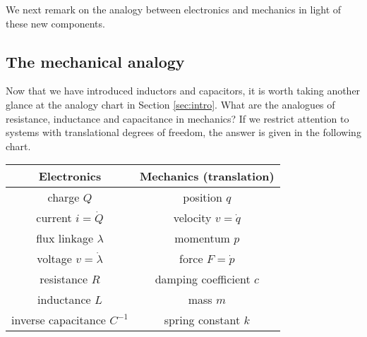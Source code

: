 We next remark on the analogy between electronics and mechanics in light of
these new components.

\subsection{The mechanical analogy} \label{sec:mechanical}

Now that we have introduced inductors and capacitors, it is worth taking 
another glance at the analogy chart in Section \ref{sec:intro}.  What are the
analogues of resistance, inductance and capacitance in mechanics?  If we restrict attention to systems with translational degrees of freedom, the answer is given in the following
chart.

\begin{small}
\begin{center}
\begin{tabular}{|c|c|}
\hline
Electronics & Mechanics (translation) \\
\hline\hline
charge $Q$ & position $q$ \\
\hline
current $i = \dot Q$ & velocity $v = \dot q$ \\
\hline
flux linkage $\lambda$ & momentum $p$ \\
\hline
voltage $v = \dot \lambda$ & force $F = \dot p$ \\
\hline
resistance $R$ & damping coefficient $c$ \\
\hline
inductance $L$ & mass $m$ \\
\hline
inverse capacitance $C^{-1}$ & spring constant $k$ \\
\hline
\end{tabular}
\end{center}
\end{small}

